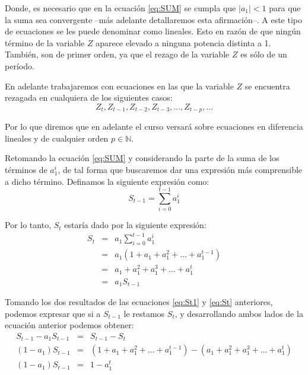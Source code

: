 \documentclass[
]{book}
\begin{document}
Donde, es necesario que en la ecuación \eqref{eq:SUM} se cumpla que \(\lvert{a_1}\lvert < 1\) para que la suma sea convergente --más adelante detallaremos esta afirmación--. A este tipo de ecuaciones se les puede denominar como lineales. Esto en razón de que ningún término de la variable \(Z\) aparece elevado a ninguna potencia distinta a 1. También, son de primer orden, ya que el rezago de la variable \(Z\) es sólo de un período.

En adelante trabajaremos con ecuaciones en las que la variable \(Z\) se encuentra rezagada en cualquiera de los siguientes casos:
\begin{equation}
    Z_t, Z_{t-1}, Z_{t-2}, Z_{t-3}, \ldots, Z_{t-p}, \ldots
    \label{eq:SUM0}
\end{equation}

Por lo que diremos que en adelante el curso versará sobre ecuaciones en diferencia lineales y de cualquier orden \(p \in \mathbb{N}\).

Retomando la ecuación \eqref{eq:SUM} y considerando la parte de la suma de los términos de \(a^i_1\), de tal forma que buscaremos dar una expresión más comprensible a dicho término. Definamos la siguiente expresión como:
\begin{equation}
    S_{t-1} = \sum^{t-1}_{i = 0}{a^i_1}
    \label{eq:St1}
\end{equation}

Por lo tanto, \(S_t\) estaría dado por la siguiente expresión:
\begin{eqnarray}
S_{t} & = & a_1 \sum^{t-1}_{i = 0}{a^i_1} \nonumber \\
      & = & a_1 (1 + a_1 + a^2_1 + \ldots + a^{t-1}_1) \nonumber \\
      & = & a_1 + a^2_1 + a^3_1 + \ldots + a^{t}_1 \nonumber \\
      & = & a_1 S_{t-1}
      \label{eq:St}
\end{eqnarray}

Tomando los dos resultados de las ecuaciones \eqref{eq:St1} y \eqref{eq:St} anteriores, podemos expresar que si a \(S_{t-1}\) le restamos \(S_t\), y desarrollando ambos lados de la ecuación anterior podemos obtener:
\begin{eqnarray}
    S_{t-1} - a_1 S_{t-1} & = & S_{t-1} - S_{t} \nonumber \\
    (1 - a_1) S_{t-1} & = & (1 + a_1 + a^2_1 + \ldots + a^{t-1}_1) - (a_1 + a^2_1 + a^3_1 + \ldots + a^{t}_1) \nonumber \\
    (1 - a_1) S_{t-1} & = & 1 - a^{t}_1 \nonumber
\end{eqnarray}
\end{document}
